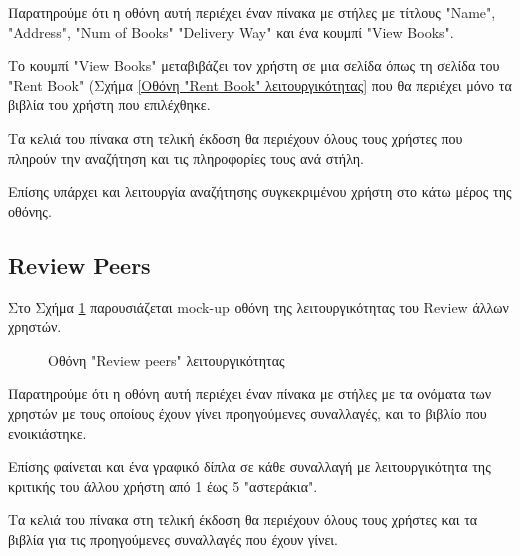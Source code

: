 \documentclass[12pt,a4paper]{article}
\begin{document}
Παρατηρούμε ότι η οθόνη αυτή περιέχει έναν πίνακα με στήλες με τίτλους "Name", "Address", "Num of Books" "Delivery Way" και ένα κουμπί "View Books". 

Το κουμπί "View Books" μεταβιβάζει τον χρήστη σε μια σελίδα όπως τη σελίδα του "Rent Book" (Σχήμα \ref{Οθόνη "Rent Book" λειτουργικότητας} που θα περιέχει μόνο τα βιβλία του χρήστη που επιλέχθηκε.

Τα κελιά του πίνακα στη τελική έκδοση θα περιέχουν όλους τους χρήστες που πληρούν την αναζήτηση και τις πληροφορίες τους ανά στήλη.

Επίσης υπάρχει και λειτουργία αναζήτησης συγκεκριμένου χρήστη στο κάτω μέρος της οθόνης.

\subsection{Review Peers}

Στο Σχήμα \ref{Οθόνη "Review peers" λειτουργικότητας} παρουσιάζεται mock-up οθόνη της λειτουργικότητας του Review άλλων χρηστών.

\begin{figure}[H]
	\caption{Οθόνη "Review peers" λειτουργικότητας}
	\label{Οθόνη "Review peers" λειτουργικότητας}
\end{figure}

Παρατηρούμε ότι η οθόνη αυτή περιέχει έναν πίνακα με στήλες με τα ονόματα των χρηστών με τους οποίους έχουν γίνει προηγούμενες συναλλαγές, και το βιβλίο που ενοικιάστηκε.

Επίσης φαίνεται και ένα γραφικό δίπλα σε κάθε συναλλαγή με λειτουργικότητα της κριτικής του άλλου χρήστη από 1 έως 5 "αστεράκια".

Τα κελιά του πίνακα στη τελική έκδοση θα περιέχουν όλους τους χρήστες και τα βιβλία για τις προηγούμενες συναλλαγές που έχουν γίνει.
\end{document}
